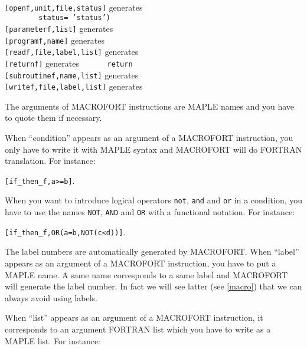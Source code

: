 \begin{tabbing}
    \\
  {\tt [openf,{\rm unit},{\rm file},{\rm status}]}
     \>generates
     \\
     \> \> {\tt\ \ \ \ \ \ \ \ status=\,'{\rm status}')}\\
  {\tt [parameterf,{\rm list}]} 
     \>generates
     \\
  {\tt [programf,{\rm name}]} \>generates
     \\
  {\tt [readf,{\rm file},{\rm label},{\rm list}]} 
    \>generates
    \\
  {\tt [returnf]} \>generates\> {\tt\ \ \ \ \ \ return}\\
  {\tt [subroutinef,{\rm name},{\rm list}]} \>generates
     \\
  {\tt [writef,{\rm file},{\rm label},{\rm list}]} 
    \>generates
    \\
\end{tabbing}


The arguments of MACROFORT instructions are MAPLE 
names and you have to quote them if
necessary.

When ``condition'' appears as an argument of a MACROFORT instruction,
you only have to write it with MAPLE syntax and MACROFORT will do
FORTRAN translation. For instance:

{\tt [if\_then\_f,a>=b]}.

When you want to introduce logical operators {\tt not}, {\tt and} and 
{\tt or} in a condition, you have to use the names {\tt NOT}, {\tt AND}
and {\tt OR} with a functional notation. 
For instance:

{\tt [if\_then\_f,OR(a=b,NOT(c<d))]}.

The label numbers are automatically generated by MACROFORT. When ``label''
appears as an argument of a MACROFORT instruction, you have to put a MAPLE
name. A same name corresponds to a same label and MACROFORT will generate
the label number. In fact we will see latter (see \ref{macro}) that we
can always avoid using labels.

When ``list'' appears as an argument of a MACROFORT instruction, it
corresponds to an argument FORTRAN list which you have to write as a
MAPLE list. For instance:

